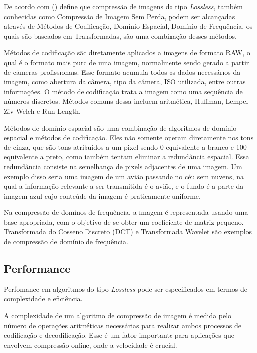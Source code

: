 De acordo com  (\citeyear{losslessmethods}) define que compressão de imagens do tipo {\em Lossless}, também conhecidas como Compressão de Imagem Sem Perda, podem ser alcançadas através de Métodos de Codificação, Domínio Espacial, Domínio de Frequência, os quais são baseados em Transformadas, são uma combinação desses métodos.

Métodos de codificação são diretamente aplicados a imagens de formato RAW, o qual é o formato mais puro de uma imagem, normalmente sendo gerado a partir de câmeras profissionais. Esse formato acumula todos os dados necessários da imagem, como abertura da câmera, tipo da câmera, ISO utilizada, entre outras informações. O método de codificação trata a imagem como uma sequência de números discretos. Métodos comuns dessa incluem aritmética, Huffman, Lempel-Ziv Welch e Run-Length.

Métodos de domínio espacial são uma combinação de algoritmos de domínio espacial e métodos de codificação. Eles não somente operam diretamente nos tons de cinza, que são tons atribuidos a um pixel sendo 0 equivalente a branco e 100 equivalente a preto, como também tentam eliminar a redundância espacial. Essa redundância consiste na semelhança de pixels adjacentes de uma imagem. Um exemplo disso seria uma imagem de um avião passando no céu sem nuvens, na qual a informação relevante a ser transmitida é o avião, e o fundo é a parte da imagem azul cujo conteúdo da imagem é praticamente uniforme.

Na compressão de domínos de frequência, a imagem é representada usando uma base apropriada, com o objetivo de se obter um coeficiente de matriz pequeno. Transformada do Cosseno Discreto (DCT) e Transformada Wavelet são exemplos de compressão de domínio de frequência.

\subsection{Performance}
\label{ss.losslessperformance}

Perfomance em algoritmos do tipo {\em Lossless} pode ser especificados em termos de complexidade e eficiência.

A complexidade de um algoritmo de compressão de imagem é medida pelo número de operações aritméticas necessárias para realizar ambos processos de codificação e decodificação. Esse é um fator importante para aplicações que envolvem compressão online, onde a velocidade é crucial.

